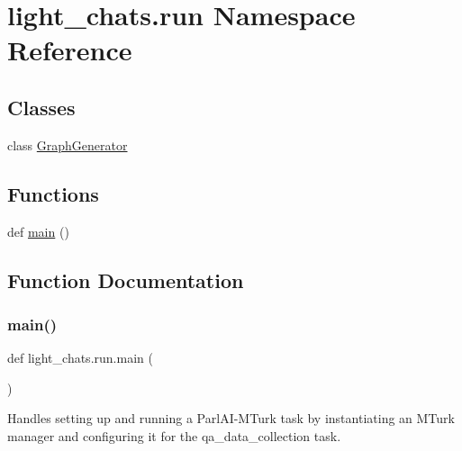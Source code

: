 \hypertarget{namespacelight__chats_1_1run}{}\section{light\+\_\+chats.\+run Namespace Reference}
\label{namespacelight__chats_1_1run}
\subsection*{Classes}
\begin{DoxyCompactItemize}
\item 
class \hyperlink{classlight__chats_1_1run_1_1GraphGenerator}{Graph\+Generator}
\end{DoxyCompactItemize}
\subsection*{Functions}
\begin{DoxyCompactItemize}
\item 
def \hyperlink{namespacelight__chats_1_1run_a1966c0bed443d10aceaa1729e5f1950c}{main} ()
\end{DoxyCompactItemize}


\subsection{Function Documentation}
\mbox{\label{namespacelight__chats_1_1run_a1966c0bed443d10aceaa1729e5f1950c}} 
\subsubsection{\texorpdfstring{main()}{main()}}
{\footnotesize\ttfamily def light\+\_\+chats.\+run.\+main (\begin{DoxyParamCaption}{ }\end{DoxyParamCaption})}

\begin{DoxyVerb}Handles setting up and running a ParlAI-MTurk task by instantiating an MTurk manager
and configuring it for the qa_data_collection task.
\end{DoxyVerb}
 